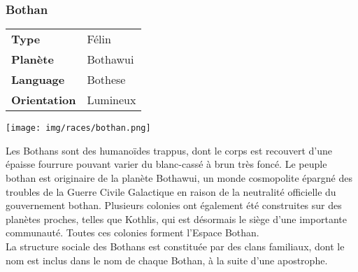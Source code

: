 \subsubsection{Bothan}

\begin{flushright}
\begin{tabular}{ l l }
	\textbf{Type} 			& Félin \\
   	\textbf{Planète} 		& Bothawui \\
   	\textbf{Language} 		& Bothese \\
   	\textbf{Orientation} 	& Lumineux \\
\end{tabular}
\end{flushright}

\vspace{-5\baselineskip}
\texttt{[image: img/races/bothan.png]}

Les Bothans sont des humanoïdes trappus, dont le corps est recouvert d'une épaisse fourrure pouvant varier du blanc-cassé à brun très foncé.
Le peuple bothan est originaire de la planète Bothawui, un monde cosmopolite épargné des troubles de la Guerre Civile Galactique en raison de la neutralité officielle du gouvernement bothan. Plusieurs colonies ont également été construites sur des planètes proches, telles que Kothlis, qui est désormais le siège d'une importante communauté. Toutes ces colonies forment l'Espace Bothan.\\
La structure sociale des Bothans est constituée par des clans familiaux, dont le nom est inclus dans le nom de chaque Bothan, à la suite d'une apostrophe.

